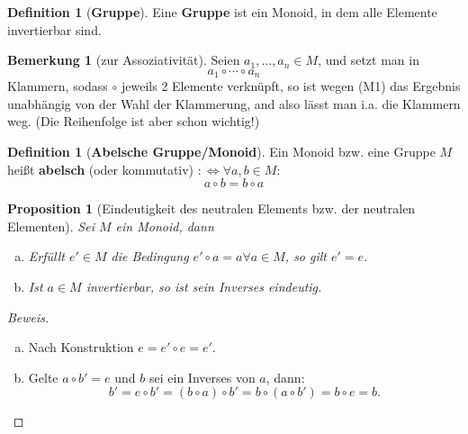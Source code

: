 \documentclass[a4paper]{report}
\theoremstyle{plain}
\newtheorem{prop}[thm]{Proposition}
\theoremstyle{definition}
\newtheorem{defi}[thm]{Definition}
\newtheorem{bem}[thm]{Bemerkung}
\begin{document}
\begin{defi}[\textbf{Gruppe}]%
Eine \textbf{Gruppe} ist ein Monoid, in dem alle Elemente invertierbar sind.
\end{defi}
\begin{bem}[zur Assoziativität]%
Seien $a_{1}, ..., a_{n} \in M$, und setzt man in
$$a_{1} \circ \cdots \circ a_{n}$$
Klammern, sodass $\circ$ jeweils 2 Elemente verknüpft, so ist wegen (M1) das Ergebnis unabhängig von der Wahl der Klammerung, and also lässt man i.a. die Klammern weg. (Die Reihenfolge ist aber schon wichtig!)
\end{bem}
\begin{defi}[\textbf{Abelsche Gruppe/Monoid}] %
Ein Monoid bzw. eine Gruppe $M$ heißt \textbf{abelsch} (oder kommutativ) $:\iff \forall a, b \in M:$ $$a \circ b = b \circ a$$
\end{defi}
\begin{prop}[Eindeutigkeit des neutralen Elements bzw. der neutralen Elementen]
  Sei $M$ ein Monoid, dann
  \begin{enumerate}[(a)]
    \item Erfüllt $e' \in M$ die Bedingung $e' \circ a = a \forall a \in M$, so gilt $e' = e$.
    \item Ist $a \in M$ invertierbar, so ist sein Inverses eindeutig.
  \end{enumerate}
\end{prop}
\begin{proof}[Beweis] \item
\begin{enumerate}[(a)]
  \item Nach Konstruktion $e = e' \circ e = e'$.
\item Gelte $a \circ b' = e$ und $b$ sei ein Inverses von $a$, dann:
$$b' = e \circ b' = (b \circ a) \circ b' = b \circ (a \circ b') = b \circ e = b. $$
\end{enumerate}
\end{proof}
\end{document}
